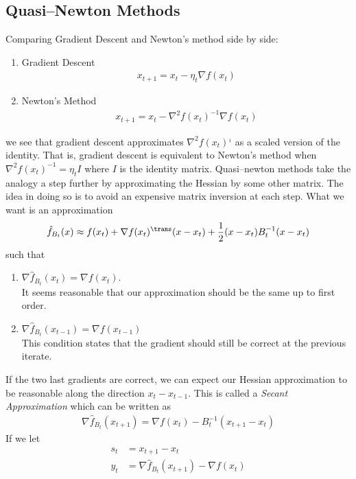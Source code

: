\subsection{Quasi--Newton Methods}
Comparing Gradient Descent and Newton's method side by side:
\begin{enumerate}
    \item Gradient Descent
    \begin{align*}
        x_{t+1} = x_t - \eta_t \nabla f(x_t)
    \end{align*}
    \item Newton's Method
    \begin{align*}
        x_{t+1} = x_t - \nabla^2 f(x_t)^{-1} \nabla f(x_t)
    \end{align*}
\end{enumerate}
we see that gradient descent approximates $\nabla^2 f(x_t)^{_1}$ as a scaled version of the identity. That is, gradient descent is equivalent to Newton's method when $\nabla^2 f(x_t)^{-1} = \eta_t I$ where $I$ is the identity matrix. Quasi--newton methods take the analogy a step further by approximating the Hessian by some other matrix. The idea in doing so is to avoid an expensive matrix inversion at each step. What we want is an approximation
\begin{align*}
    \hat{f}_{B_t}(x) \approx f(x_t) + \nabla f(x_t)^\trans (x - x_t) + \dfrac{1}{2} (x-x_t)B_t^{-1} (x-x_t)
\end{align*}
such that
\begin{enumerate}
    \item $\nabla \hat{f}_{B_t} (x_t) = \nabla f(x_t)$.\\
    It seems reasonable that our approximation should be the same up to first order. 
    \item $\nabla \hat{f}_{B_t} (x_{t-1}) = \nabla f(x_{t-1})$\\
    This condition states that the gradient should still be correct at the previous iterate.
\end{enumerate}
 If the two last gradients are correct, we can expect our Hessian approximation to be reasonable along the direction $x_t - x_{t-1}$. This is called a \emph{Secant Approximation} which can be written as 
 \begin{align*}
     \nabla \hat{f}_{B_t} (x_{t+1}) = \nabla f(x_t) - B_t^{-1}(x_{t+1} - x_t)
 \end{align*}
 If we let
 \begin{align*}
     s_t &= x_{t+1} - x_t \\
     y_t &= \nabla \hat{f}_{B_t}(x_{t+1}) - \nabla f(x_t)
 \end{align*}
